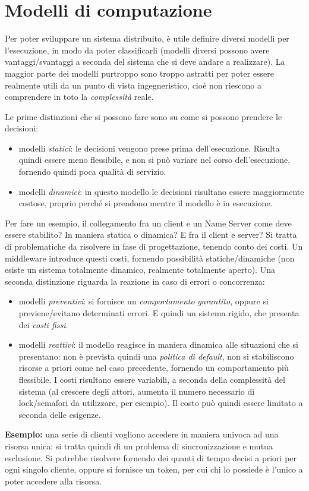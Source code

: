 \section{Modelli di computazione}
Per poter sviluppare un sistema distribuito, è utile definire diversi modelli per l'esecuzione, in modo da poter
classificarli (modelli diversi possono avere vantaggi/svantaggi a seconda del sistema che si deve andare a realizzare).
La maggior parte dei modelli purtroppo sono troppo astratti per poter essere realmente utili da un punto di vista
ingegneristico, cioè non riescono a comprendere in toto la \textit{complessità} reale.

Le prime distinzioni che si possono fare sono su come si possono prendere le decisioni:
\begin{itemize}
 \item modelli \textit{statici}: le decisioni vengono prese prima dell'esecuzione. Risulta quindi essere meno
flessibile, e non si può variare nel corso dell'esecuzione, fornendo quindi poca qualità di servizio.
\item modelli \textit{dinamici}: in questo modello le decisioni risultano essere maggiormente costose, proprio perché
si prendono mentre il modello è in esecuzione.
\end{itemize}
Per fare un esempio, il collegamento fra un client e un Name Server come deve essere stabilito? In maniera statica o
dinamica? E fra il client e server? Si tratta di problematiche da risolvere in fase di progettazione, tenendo conto
dei costi. Un middleware introduce questi costi, fornendo possibilità statiche/dinamiche (non esiste un sistema
totalmente dinamico, realmente totalmente aperto).
Una seconda distinzione riguarda la reazione in caso di errori o concorrenza:
\begin{itemize}
 \item modelli \textit{preventivi}: si fornisce un \textit{comportamento garantito}, oppure si previene/evitano
determinati errori. E quindi un sistema rigido, che presenta dei \textit{costi fissi}.
\item modelli \textit{reattivi}: il modello reagisce in maniera dinamica alle situazioni che si presentano: non è
prevista quindi una \textit{politica di default}, non si stabiliscono risorse a priori come nel caso precedente,
fornendo un comportamento più flessibile. I costi risultano essere variabili, a seconda della complessità del sistema
(al crescere degli attori, aumenta il numero necessario di lock/semafori da utilizzare, per esempio). Il costo può
quindi essere limitato a seconda delle esigenze.
\end{itemize}
\textbf{Esempio:} una serie di clienti vogliono accedere in maniera univoca ad
una risorsa unica: si tratta quindi di un problema
di sincronizzazione e mutua esclusione. Si potrebbe risolvere fornendo dei quanti di tempo decisi a priori per ogni
singolo cliente, oppure si fornisce un token, per cui chi lo possiede è l'unico a poter accedere alla risorsa.

